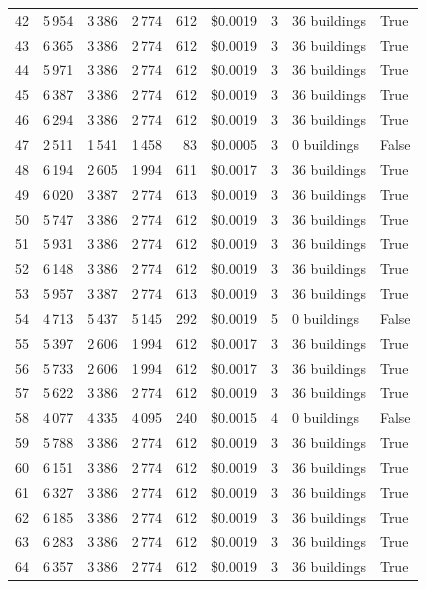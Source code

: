\documentclass[a4paper,11pt]{article}
\begin{document}
\begin{table}[ht]
\begin{tabular}{r r r r r r r p{3cm} l}
42 & 5\,954 & 3\,386 & 2\,774 & 612 & \$0.0019 & 3 & 36 buildings & True \\
43 & 6\,365 & 3\,386 & 2\,774 & 612 & \$0.0019 & 3 & 36 buildings & True \\
44 & 5\,971 & 3\,386 & 2\,774 & 612 & \$0.0019 & 3 & 36 buildings & True \\
45 & 6\,387 & 3\,386 & 2\,774 & 612 & \$0.0019 & 3 & 36 buildings & True \\
46 & 6\,294 & 3\,386 & 2\,774 & 612 & \$0.0019 & 3 & 36 buildings & True \\
47 & 2\,511 & 1\,541 & 1\,458 & 83 & \$0.0005 & 3 & 0 buildings & False \\
48 & 6\,194 & 2\,605 & 1\,994 & 611 & \$0.0017 & 3 & 36 buildings & True \\
49 & 6\,020 & 3\,387 & 2\,774 & 613 & \$0.0019 & 3 & 36 buildings & True \\
50 & 5\,747 & 3\,386 & 2\,774 & 612 & \$0.0019 & 3 & 36 buildings & True \\
51 & 5\,931 & 3\,386 & 2\,774 & 612 & \$0.0019 & 3 & 36 buildings & True \\
52 & 6\,148 & 3\,386 & 2\,774 & 612 & \$0.0019 & 3 & 36 buildings & True \\
53 & 5\,957 & 3\,387 & 2\,774 & 613 & \$0.0019 & 3 & 36 buildings & True \\
54 & 4\,713 & 5\,437 & 5\,145 & 292 & \$0.0019 & 5 & 0 buildings & False \\
55 & 5\,397 & 2\,606 & 1\,994 & 612 & \$0.0017 & 3 & 36 buildings & True \\
56 & 5\,733 & 2\,606 & 1\,994 & 612 & \$0.0017 & 3 & 36 buildings & True \\
57 & 5\,622 & 3\,386 & 2\,774 & 612 & \$0.0019 & 3 & 36 buildings & True \\
58 & 4\,077 & 4\,335 & 4\,095 & 240 & \$0.0015 & 4 & 0 buildings & False \\
59 & 5\,788 & 3\,386 & 2\,774 & 612 & \$0.0019 & 3 & 36 buildings & True \\
60 & 6\,151 & 3\,386 & 2\,774 & 612 & \$0.0019 & 3 & 36 buildings & True \\
61 & 6\,327 & 3\,386 & 2\,774 & 612 & \$0.0019 & 3 & 36 buildings & True \\
62 & 6\,185 & 3\,386 & 2\,774 & 612 & \$0.0019 & 3 & 36 buildings & True \\
63 & 6\,283 & 3\,386 & 2\,774 & 612 & \$0.0019 & 3 & 36 buildings & True \\
64 & 6\,357 & 3\,386 & 2\,774 & 612 & \$0.0019 & 3 & 36 buildings & True \\

\end{tabular}
\end{table}
\end{document}
